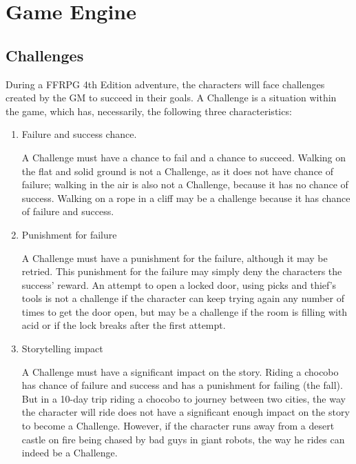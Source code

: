 \section{Game Engine}

\subsection{Challenges}
During a FFRPG 4th Edition adventure, the
characters will face challenges created by the GM
to succeed in their goals. A Challenge is a situation
within the game, which has, necessarily, the
following three characteristics:

\begin{enumerate}[label=\alph*]
\item Failure and success chance.

A Challenge must have a chance to fail and a chance to succeed.
Walking on the flat and solid ground is not a
Challenge, as it does not have chance of failure;
walking in the air is also not a Challenge, because
it has no chance of success. Walking on a rope in a
cliff may be a challenge because it has chance of
failure and success.

\item Punishment for failure

A Challenge must
have a punishment for the failure, although it may
be retried. This punishment for the failure may
simply deny the characters the success’ reward. An
attempt to open a locked door, using picks and
thief’s tools is not a challenge if the character can
keep trying again any number of times to get the
door open, but may be a challenge if the room is
filling with acid or if the lock breaks after the first
attempt.

\item Storytelling impact

A Challenge must
have a significant impact on the story. Riding a
chocobo has chance of failure and success and has
a punishment for failing (the fall). But in a 10-day
trip riding a chocobo to journey between two cities,
the way the character will ride does not have a
significant enough impact on the story to become
a Challenge. However, if the character runs away
from a desert castle on fire being chased by bad
guys in giant robots, the way he rides can indeed
be a Challenge.

\end{enumerate}

